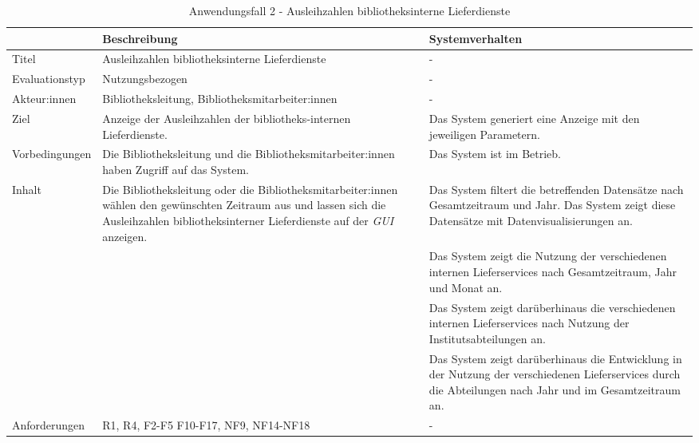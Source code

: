 \begingroup
\setlength{\tabcolsep}{10pt} %
\renewcommand{\arraystretch}{1.25} 
\begin{table}[h]
    \centering
    \begin{adjustbox}{max width=\textwidth}
    \begin{tabular}{lp{7.0cm}p{7.0cm}}
       \toprule
       \textbf{}          & \textbf{Beschreibung} &\textbf{Systemverhalten}\\
       \midrule
        Titel                            &Ausleihzahlen bibliotheksinterne Lieferdienste& -\\
        Evaluationstyp                   &Nutzungsbezogen                   & -\\
        Akteur:innen                     &Bibliotheksleitung, Bibliotheksmitarbeiter:innen& -\\
        Ziel                             &Anzeige der Ausleihzahlen der bibliotheks-internen Lieferdienste.& Das System generiert eine Anzeige mit den jeweiligen Parametern.\\
        Vorbedingungen                   &Die Bibliotheksleitung und die Bibliotheksmitarbeiter:innen haben Zugriff auf das System.& Das System ist im Betrieb.\\
        Inhalt                          &Die Bibliotheksleitung oder die Bibliotheksmitarbeiter:innen wählen den gewünschten Zeitraum aus und lassen sich die Ausleihzahlen bibliotheksinterner Lieferdienste auf der \textit{\acrshort{GUI}} anzeigen. & Das System filtert die betreffenden Datensätze nach Gesamtzeitraum und Jahr. Das System zeigt diese Datensätze mit Datenvisualisierungen an.\\
                                        & &Das System zeigt die Nutzung der verschiedenen internen Lieferservices nach Gesamtzeitraum, Jahr und Monat an.\\
                                        & &Das System zeigt darüberhinaus die verschiedenen internen Lieferservices nach Nutzung der Institutsabteilungen an.\\
                                        & &Das System zeigt darüberhinaus die Entwicklung in der Nutzung der verschiedenen Lieferservices durch die Abteilungen nach Jahr und im Gesamtzeitraum an.\\
        Anforderungen                   &R1, R4, F2-F5 F10-F17, NF9, NF14-NF18& -\\
        \bottomrule
    \end{tabular}
    \end{adjustbox}
    \caption{%
    Anwendungsfall 2 - Ausleihzahlen bibliotheksinterne Lieferdienste
    }
    \label{tab:AF_Lieferdienste}
    \end{table}
\endgroup

